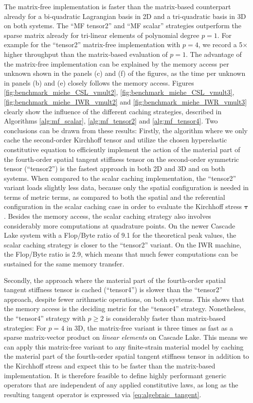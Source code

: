 \documentclass[AMA,STIX1COL]{WileyNJD-v2}
\newcommand*{\gz}[1]{\boldsymbol{#1}}
\begin{document}
The matrix-free implementation is faster than the matrix-based counterpart already for a bi-quadratic Lagrangian basis in 2D and a tri-quadratic basis in 3D on both systems.
{\color{red}
The ``MF tensor2'' and ``MF scalar'' strategies outperform the sparse matrix already for tri-linear elements of polynomial degree $p=1$. For example for the ``tensor2'' matrix-free implementation with $p=4$, we record a 5$\times$ higher throughput than the matrix-based evaluation of $p=1$. The advantage of the matrix-free implementation can be explained by the memory access per unknown shown in the panels (c) and (f) of the figures, as the time per unknown in panels (b) and (e) closely follows the memory access.
}
Figures \ref{fig:benchmark_miehe_CSL_vmult2}, \ref{fig:benchmark_miehe_CSL_vmult3}, \ref{fig:benchmark_miehe_IWR_vmult2} and \ref{fig:benchmark_miehe_IWR_vmult3} clearly show the influence of the different caching strategies,
described in Algorithms \ref{alg:mf_scalar}, \ref{alg:mf_tensor2} and \ref{alg:mf_tensor4}.
Two conclusions can be drawn from these results:
{\color{red}
Firstly, the algorithm where we only cache the second-order Kirchhoff tensor and utilize the chosen hyperelastic constitutive equation to efficiently implement the action of the material part of the fourth-order spatial tangent stiffness tensor on the second-order symmetric tensor (``tensor2'') is the fastest approach in both 2D and 3D and on both systems. When compared to the scalar caching implementation, the ``tensor2'' variant loads slightly less data, because only the spatial configuration is needed in terms of metric terms, as compared to both the spatial and the referential configuration in the scalar caching case in order to evaluate the Kirchhoff stress $\gz \tau$. Besides the memory access, the scalar caching strategy also involves considerably more computations at quadrature points. On the newer Cascade Lake system with a Flop/Byte ratio of 9.1 for the theoretical peak values, the scalar caching strategy is closer to the ``tensor2'' variant. On the IWR machine, the Flop/Byte ratio is 2.9, which means that much fewer computations can be sustained for the same memory transfer.
}

{\color{red}
Secondly, the approach where the material part of the fourth-order spatial tangent stiffness tensor is cached (``tensor4'') is slower than the ``tensor2'' approach, despite fewer arithmetic operations, on both systems. This shows that the memory access is the deciding metric for the ``tensor4'' strategy.
Nonetheless, the ``tensor4'' strategy with $p\geq 2$ is considerably faster than matrix-based strategies: For $p=4$ in 3D, the matrix-free variant is three times as fast as a sparse matrix-vector product on \emph{linear elements} on Cascade Lake. This means we can apply this matrix-free variant to any finite-strain material model by caching the material part of the fourth-order spatial tangent stiffness tensor in addition to the Kirchhoff stress and expect this to be faster than the matrix-based implementation.
}
It is therefore feasible to define highly performant generic operators that are independent of any applied constitutive laws,
as long as the resulting tangent operator is expressed via \eqref{eq:algebraic_tangent}.
\end{document}
